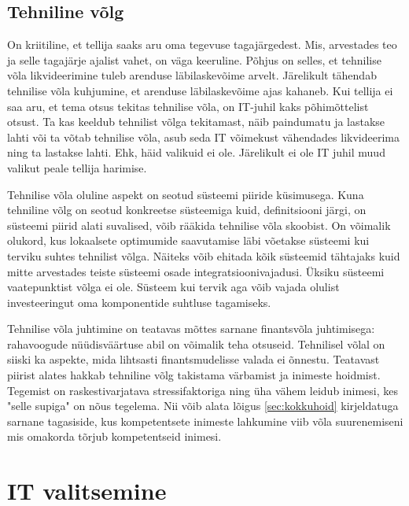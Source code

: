 \documentclass{article}
\begin{document}
\subsection{Tehniline võlg}
On kriitiline, et tellija saaks aru oma tegevuse tagajärgedest. Mis, arvestades teo ja selle tagajärje ajalist vahet, on väga keeruline. Põhjus on selles, et tehnilise võla likvideerimine tuleb arenduse läbilaskevõime arvelt. Järelikult tähendab tehnilise võla kuhjumine, et arenduse läbilaskevõime ajas kahaneb. Kui tellija ei saa aru, et tema otsus tekitas tehnilise võla, on IT-juhil kaks põhimõttelist otsust. Ta kas keeldub tehnilist võlga tekitamast, näib paindumatu ja lastakse lahti või ta võtab tehnilise võla, asub seda IT võimekust vähendades likvideerima ning ta lastakse lahti. Ehk, häid valikuid ei ole. Järelikult ei ole IT juhil muud valikut peale tellija harimise.

Tehnilise võla oluline aspekt on seotud süsteemi piiride küsimusega. Kuna tehniline võlg on seotud konkreetse süsteemiga kuid, definitsiooni järgi, on süsteemi piirid alati suvalised, võib rääkida tehnilise võla skoobist. On võimalik olukord, kus lokaalsete optimumide saavutamise läbi võetakse süsteemi kui terviku suhtes tehnilist võlga. Näiteks võib ehitada kõik süsteemid tähtajaks kuid mitte arvestades teiste süsteemi osade integratsioonivajadusi. Üksiku süsteemi vaatepunktist võlga ei ole. Süsteem kui tervik aga võib vajada olulist investeeringut oma komponentide suhtluse tagamiseks. 

Tehnilise võla juhtimine on teatavas mõttes sarnane finantsvõla juhtimisega: rahavoogude nüüdisväärtuse abil on võimalik teha otsuseid. Tehnilisel võlal on siiski ka aspekte, mida lihtsasti finantsmudelisse valada ei õnnestu. Teatavast piirist alates hakkab tehniline võlg takistama värbamist ja inimeste hoidmist. Tegemist on raskestivarjatava stressifaktoriga ning üha vähem leidub inimesi, kes "selle supiga" on nõus tegelema. Nii võib alata lõigus \ref{sec:kokkuhoid} kirjeldatuga sarnane tagasiside, kus kompetentsete inimeste lahkumine viib võla suurenemiseni mis omakorda tõrjub kompetentseid inimesi. 

\section{IT valitsemine}
\end{document}
